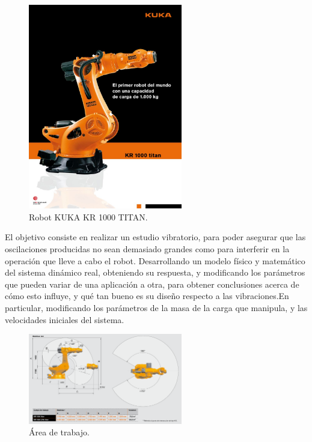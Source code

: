 \documentclass{aleph-revista}
\begin{document}
\begin{figure}[H]
    \centering
    \includegraphics[width=0.60\textwidth]{Imagenes/modelo_2.jpg}
    \caption{Robot KUKA KR 1000 TITAN.}
    \label{fig:etiqueta de la figura}
\end{figure}

El objetivo consiste en realizar un estudio vibratorio, para poder asegurar que las oscilaciones producidas no sean demasiado grandes como para interferir en la operación que lleve a cabo el robot.
Desarrollando un modelo físico y matemático del sistema dinámico real, obteniendo su respuesta, y modificando los parámetros que pueden variar de una aplicación a otra, para obtener conclusiones acerca de cómo esto influye, y qué tan bueno es su diseño respecto a las vibraciones.En particular, modificando los parámetros de la masa de la carga que manipula, y las velocidades iniciales del sistema.

\begin{figure}[H]
    \centering
    \includegraphics[width=0.60\textwidth]{Imagenes/area_trabajo.png}
    \caption{Área de trabajo.}
    \label{fig:etiqueta de la figura}
\end{figure}
\end{document}

